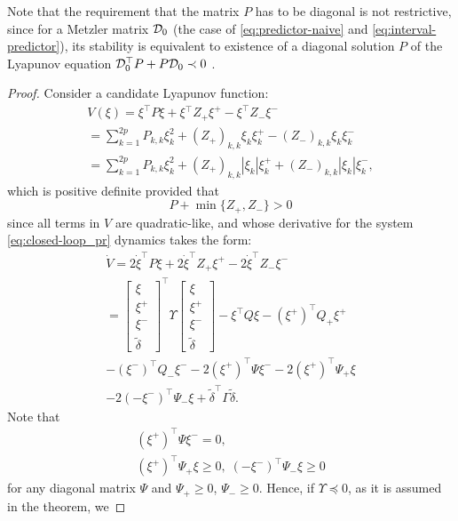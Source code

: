 \documentclass[letterpaper, 10 pt, conference]{ieeeconf}  %
\begin{document}
Note that the requirement that the matrix $P$ has to be diagonal is not
restrictive, since for a Metzler matrix $\mathcal{D}_{0}$ (the case of \eqref{eq:predictor-naive}
and \eqref{eq:interval-predictor}), its stability is equivalent to
existence of a diagonal solution $P$ of the Lyapunov equation $\mathcal{D}_{0}^{\top}P+P\mathcal{D}_{0}\prec0$
\cite{Positive}.
\begin{proof}
Consider a candidate Lyapunov function:
\begin{gather*}
V(\xi)=\xi^{\top}P\xi+\xi{}^{\top}Z_{+}\xi^{+}-\xi^{\top}Z_{-}\xi^{-}\\
=\sum_{k=1}^{2p}P_{k,k}\xi_{k}^{2}+(Z_{+})_{k,k}\xi_{k}\xi_{k}^{+}-(Z_{-})_{k,k}\xi_{k}\xi_{k}^{-}\\
=\sum_{k=1}^{2p}P_{k,k}\xi_{k}^{2}+(Z_{+})_{k,k}|\xi_{k}|\xi_{k}^{+}+(Z_{-})_{k,k}|\xi_{k}|\xi_{k}^{-},
\end{gather*}
which is positive definite provided that
\[
P+\min\{Z_{+},Z_{-}\}>0
\]
since all terms in $V$ are quadratic-like, and whose derivative for
the system \eqref{eq:closed-loop_pr} dynamics takes the form:
\begin{gather*}
\dot{V}=2\dot{\xi}^{\top}P\xi+2\dot{\xi}^{\top}Z_{+}\xi^{+}-2\dot{\xi}^{\top}Z_{-}\xi^{-}\\
=\left[\begin{array}{c}
\xi\\
\xi^{+}\\
\xi^{-}\\
\tilde{\delta}
\end{array}\right]^{\top}\Upsilon\left[\begin{array}{c}
\xi\\
\xi^{+}\\
\xi^{-}\\
\tilde{\delta}
\end{array}\right]-\xi^{\top}Q\xi-(\xi^{+})^{\top}Q_{+}\xi^{+}\\
-(\xi^{-})^{\top}Q_{-}\xi^{-}-2(\xi^{+})^{\top}\Psi\xi^{-}-2(\xi^{+})^{\top}\Psi_{+}\xi\\
-2(-\xi^{-})^{\top}\Psi_{-}\xi+\tilde{\delta}^{\top}\Gamma\tilde{\delta}.
\end{gather*}
Note that
\begin{gather*}
(\xi^{+})^{\top}\Psi\xi^{-}=0,\\
(\xi^{+})^{\top}\Psi_{+}\xi\geq0,\;(-\xi^{-})^{\top}\Psi_{-}\xi\geq0
\end{gather*}
for any diagonal matrix $\Psi$ and $\Psi_{+}\geq0$, $\Psi_{-}\geq0$.
Hence, if $\Upsilon\preceq0$, as it is assumed in the theorem, we

\end{proof}
\end{document}

